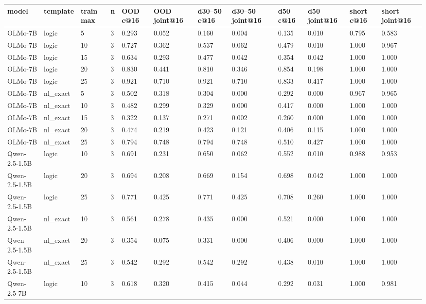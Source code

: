 \documentclass[10pt]{article}
\begin{document}
\begin{table}[H]
\centering
\scriptsize
\begin{tabular}{llllllllllll}
\toprule
model & template & train max & n & OOD c@16 & OOD joint@16 & d30--50 c@16 & d30--50 joint@16 & d50 c@16 & d50 joint@16 & short c@16 & short joint@16 \\
\midrule
OLMo-7B & logic & 5 & 3 & 0.293 & 0.052 & 0.160 & 0.004 & 0.135 & 0.010 & 0.795 & 0.583 \\
OLMo-7B & logic & 10 & 3 & 0.727 & 0.362 & 0.537 & 0.062 & 0.479 & 0.010 & 1.000 & 0.967 \\
OLMo-7B & logic & 15 & 3 & 0.634 & 0.293 & 0.477 & 0.042 & 0.354 & 0.042 & 1.000 & 1.000 \\
OLMo-7B & logic & 20 & 3 & 0.830 & 0.441 & 0.810 & 0.346 & 0.854 & 0.198 & 1.000 & 1.000 \\
OLMo-7B & logic & 25 & 3 & 0.921 & 0.710 & 0.921 & 0.710 & 0.833 & 0.417 & 1.000 & 1.000 \\
OLMo-7B & nl\_exact & 5 & 3 & 0.502 & 0.318 & 0.304 & 0.000 & 0.292 & 0.000 & 0.967 & 0.965 \\
OLMo-7B & nl\_exact & 10 & 3 & 0.482 & 0.299 & 0.329 & 0.000 & 0.417 & 0.000 & 1.000 & 1.000 \\
OLMo-7B & nl\_exact & 15 & 3 & 0.322 & 0.137 & 0.271 & 0.002 & 0.260 & 0.000 & 1.000 & 1.000 \\
OLMo-7B & nl\_exact & 20 & 3 & 0.474 & 0.219 & 0.423 & 0.121 & 0.406 & 0.115 & 1.000 & 1.000 \\
OLMo-7B & nl\_exact & 25 & 3 & 0.794 & 0.748 & 0.794 & 0.748 & 0.510 & 0.427 & 1.000 & 1.000 \\
Qwen-2.5-1.5B & logic & 10 & 3 & 0.691 & 0.231 & 0.650 & 0.062 & 0.552 & 0.010 & 0.988 & 0.953 \\
Qwen-2.5-1.5B & logic & 20 & 3 & 0.694 & 0.208 & 0.669 & 0.154 & 0.698 & 0.042 & 1.000 & 1.000 \\
Qwen-2.5-1.5B & logic & 25 & 3 & 0.771 & 0.425 & 0.771 & 0.425 & 0.708 & 0.260 & 1.000 & 1.000 \\
Qwen-2.5-1.5B & nl\_exact & 10 & 3 & 0.561 & 0.278 & 0.435 & 0.000 & 0.521 & 0.000 & 1.000 & 1.000 \\
Qwen-2.5-1.5B & nl\_exact & 20 & 3 & 0.354 & 0.075 & 0.331 & 0.000 & 0.406 & 0.000 & 1.000 & 1.000 \\
Qwen-2.5-1.5B & nl\_exact & 25 & 3 & 0.542 & 0.292 & 0.542 & 0.292 & 0.438 & 0.010 & 1.000 & 1.000 \\
Qwen-2.5-7B & logic & 10 & 3 & 0.618 & 0.320 & 0.415 & 0.044 & 0.292 & 0.031 & 1.000 & 0.981 \\

\end{tabular}
\end{table}
\end{document}
